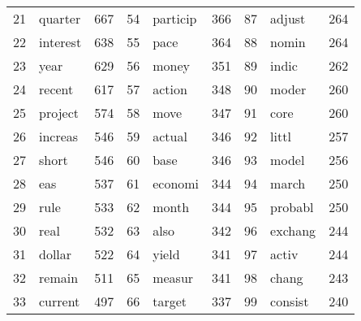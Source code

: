 \begin{tabular}{rlrrlrrlr}
 21 &   quarter &    667 &  54 &   particip &    366 &  87 &   adjust &    264 \\
 22 &  interest &    638 &  55 &       pace &    364 &  88 &    nomin &    264 \\
 23 &      year &    629 &  56 &      money &    351 &  89 &    indic &    262 \\
 24 &    recent &    617 &  57 &     action &    348 &  90 &    moder &    260 \\
 25 &   project &    574 &  58 &       move &    347 &  91 &     core &    260 \\
 26 &   increas &    546 &  59 &     actual &    346 &  92 &    littl &    257 \\
 27 &     short &    546 &  60 &       base &    346 &  93 &    model &    256 \\
 28 &       eas &    537 &  61 &    economi &    344 &  94 &    march &    250 \\
 29 &      rule &    533 &  62 &      month &    344 &  95 &  probabl &    250 \\
 30 &      real &    532 &  63 &       also &    342 &  96 &  exchang &    244 \\
 31 &    dollar &    522 &  64 &      yield &    341 &  97 &    activ &    244 \\
 32 &    remain &    511 &  65 &     measur &    341 &  98 &    chang &    243 \\
 33 &   current &    497 &  66 &     target &    337 &  99 &  consist &    240 \\
\bottomrule
\end{tabular}

